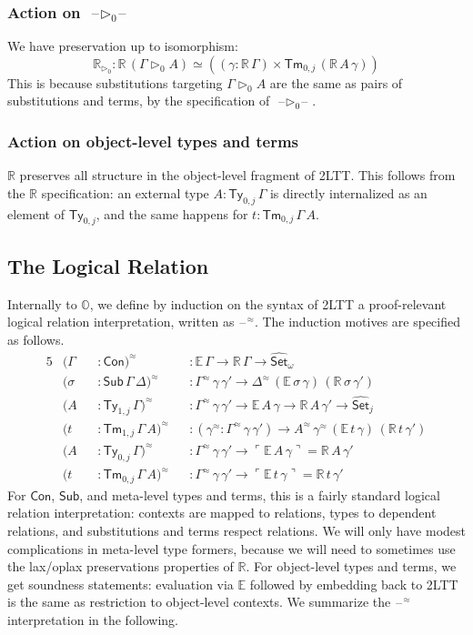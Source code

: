 \documentclass[acmsmall]{acmart}
\newcommand{\msf}[1]{\mathsf{#1}}
\newcommand{\mbb}[1]{\mathbb{#1}}
\newcommand{\wh}[1]{\widehat{#1}}
\newcommand{\ext}{\triangleright}
\newcommand{\mbbo}{\mbb{O}}
\newcommand{\Con}{\msf{Con}}
\newcommand{\Sub}{\msf{Sub}}
\newcommand{\Ty}{\msf{Ty}}
\newcommand{\Tm}{\msf{Tm}}
\newcommand{\Set}{\mathsf{Set}}
\newcommand{\blank}{{\mathord{\hspace{1pt}\text{--}\hspace{1pt}}}}
\newcommand{\emb}[1]{\ulcorner#1\urcorner}
\newcommand{\hato}{\bm\hat{\mbbo}}
\newcommand{\ev}{\mbb{E}}
\newcommand{\re}{\mbb{R}}
\theoremstyle{remark}
\newcommand{\whset}{\wh{\Set}}
\newcommand{\rel}{^{\approx}}
\begin{document}
\subsubsection{Action on $\blank\ext_0\blank$} We have preservation up to isomorphism:
\[
  \re_{\ext_0} : \re\,(\Gamma \ext_0 A) \simeq ((\gamma : \re\,\Gamma)\times \Tm_{0,j}\,(\re\,A\,\gamma))
\]
This is because substitutions targeting $\Gamma \ext_0 A$ are the same as
pairs of substitutions and terms, by the specification of $\blank\ext_0\blank$.

\subsubsection{Action on object-level types and terms} $\re$ preserves all structure
in the object-level fragment of 2LTT. This follows from the $\re$ specification:
an external type $A : \Ty_{0,j}\,\Gamma$ is directly internalized as an element
of $\Ty_{0,j}$, and the same happens for $t : \Tm_{0,j}\,\Gamma\,A$.


\subsection{The Logical Relation}

Internally to $\hato$, we define by induction on the syntax of 2LTT a
proof-relevant logical relation interpretation, written as $\blank^{\approx}$. The induction
motives are specified as follows.
\begin{alignat*}{5}
  &(\Gamma &&: \Con)\rel && : \ev\,\Gamma \to \re\,\Gamma \to \whset_\omega\\
  &(\sigma &&: \Sub\,\Gamma\,\Delta)\rel &&: \Gamma\rel\,\gamma\,\gamma' \to \Delta\rel\,(\ev\,\sigma\,\gamma)\,(\re\,\sigma\,\gamma')\\
  &(A      &&: \Ty_{1,j}\,\Gamma)\rel &&: \Gamma\rel\,\gamma\,\gamma' \to \ev\,A\,\gamma \to \re\,A\,\gamma' \to \whset_j\\
  &(t      &&: \Tm_{1,j}\,\Gamma\,A)\rel &&: (\gamma\rel : \Gamma\rel\,\gamma\,\gamma') \to A\rel\,\gamma\rel\,(\ev\,t\,\gamma)\,(\re\,t\,\gamma')\\
  &(A      &&: \Ty_{0,j}\,\Gamma)\rel &&: \Gamma\rel\,\gamma\,\gamma' \to \emb{\ev\,A\,\gamma} = \re\,A\,\gamma' \\
  &(t      &&: \Tm_{0,j}\,\Gamma\,A)\rel &&: \Gamma\rel\,\gamma\,\gamma' \to \emb{\ev\,t\,\gamma} = \re\,t\,\gamma'
\end{alignat*}
For $\Con$, $\Sub$, and meta-level types and terms, this is a fairly standard
logical relation interpretation: contexts are mapped to relations, types to
dependent relations, and substitutions and terms respect relations. We will only have
modest complications in meta-level type formers, because we will need to sometimes use
the lax/oplax preservations properties of $\re$. For object-level types and
terms, we get soundness statements: evaluation via $\ev$ followed by embedding
back to 2LTT is the same as restriction to object-level contexts. We summarize
the $\blank\rel$ interpretation in the following.
\end{document}
